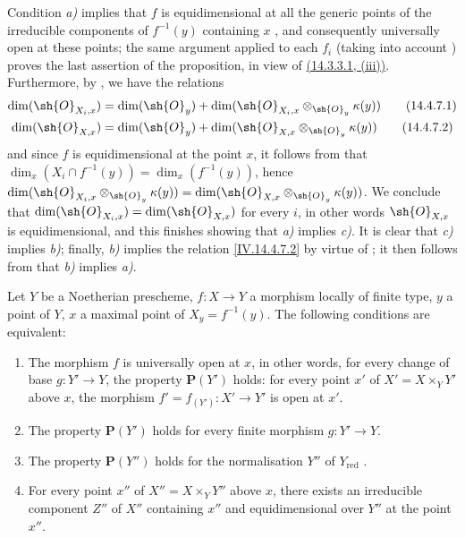 Condition \emph{a)} implies that $f$ is equidimensional at all the generic points of the irreducible components of $f^{-1}(y)$ containing $x$ , and consequently  universally open at these points; the same argument applied to each $f_i$ (taking into account ) proves the last assertion of the proposition, in view of {\hyperlink{ega4.c04.subsec.14-3-3-1}{(14.3.3.1, (iii))}}.
Furthermore, by , we have the relations
\begin{align}
  \dim(\sh{O}_{X_i,x}) &= \dim(\sh{O}_y) + \dim(\sh{O}_{X_i,x}\otimes_{\sh{O}_y}\kappa(y))
  \tag{14.4.7.1}\label{IV.14.4.7.1}\\
  \dim(\sh{O}_{X,x}) &= \dim(\sh{O}_y) + \dim(\sh{O}_{X,x}\otimes_{\sh{O}_y}\kappa(y))
  \tag{14.4.7.2}\label{IV.14.4.7.2}
\end{align}
and since $f$ is equidimensional at the point $x$, it follows from  that $\dim_x(X_i\cap f^{-1}(y))=\dim_x(f^{-1}(y))$, hence  $\dim(\sh{O}_{X_i,x}\otimes_{\sh{O}_y}\kappa(y))=\dim(\sh{O}_{X,x}\otimes_{\sh{O}_y}\kappa(y))$.
We conclude that $\dim(\sh{O}_{X_i,x})=\dim(\sh{O}_{X,x})$ for every $i$, in other words $\sh{O}_{X,x}$ is equidimensional, and this finishes showing that \emph{a)} implies \emph{c)}.
It is clear that \emph{c)} implies \emph{b)}; finally, \emph{b)} implies the relation \eqref{IV.14.4.7.2} by virtue of ; it then follows from  that \emph{b)} implies \emph{a)}.

\begin{proposition}[14.4.8]
\label{IV.14.4.8}
Let $Y$ be a Noetherian prescheme, $f:X\to Y$ a morphism locally of finite type, $y$ a point of $Y$, $x$ a maximal point of $X_y=f^{-1}(y)$.
The following conditions are equivalent:
\begin{enumerate}[label=\emph{\alph*)}]
  \item The morphism $f$ is universally open at $x$, in other words, for every change of base $g:Y'\to Y$, the property $\mathbf{P}(Y')$ holds: for every point $x'$ of $X'=X\times_Y Y'$ above $x$, the morphism $f'=f_{(Y')}:X'\to Y'$ is open at $x'$.
  \item[\emph{a$'$)}] The property $\mathbf{P}(Y')$ holds for every finite morphism $g:Y'\to Y$.
  \item[\emph{a$''$)}] The property $\mathbf{P}(Y'')$ holds for the normalisation $Y''$ of $Y_{\mathrm{red}}$ .
  \item For every point $x''$ of $X''=X\times_Y Y''$ above $x$, there exists an irreducible component $Z''$ of $X''$ containing $x''$ and equidimensional over $Y''$ at the point $x''$.
\end{enumerate}
\end{proposition}

